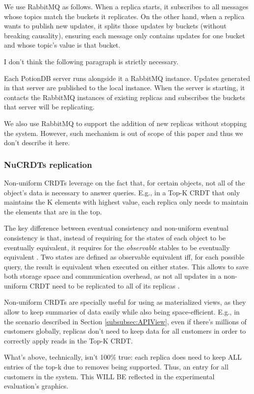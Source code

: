 \documentclass{vldb}
\newcommand{\grumbler}[2]{{\color{red}{\bf #1:} #2}}
\newcommand{\andre}[1]{\grumbler{andre}{#1}}
\begin{document}
We use RabbitMQ as follows.
When a replica starts, it subscribes to all messages whose topics match the buckets it replicates.
On the other hand, when a replica wants to publish new updates, it splits those updates by buckets (without breaking causality), ensuring each message only contains updates for one bucket and whose topic's value is that bucket.

\andre{I don't think the following paragraph is strictly necessary.}

Each PotionDB server runs alongside it a RabbitMQ instance.
Updates generated in that server are published to the local instance.
When the server is starting, it contacts the RabbitMQ instances of existing replicas and subscribes the buckets that server will be replicating.

We also use RabbitMQ to support the addition of new replicas without stopping the system.
However, such mechanism is out of scope of this paper and thus we don't describe it here.

\subsubsection{NuCRDTs replication}
\label{subsubsec:nureplication}

Non-uniform CRDTs \cite{???} leverage on the fact that, for certain objects, not all of the object's data is necessary to answer queries.
E.g., in a Top-K CRDT that only maintains the K elements with highest value, each replica only needs to maintain the elements that are in the top.

The key difference between eventual consistency and non-uniform eventual consistency is that, instead of requiring for the states of each object to be eventually equivalent, it requires for the \emph{observable} stables to be eventually equivalent \cite{???}.
Two states are defined as observable equivalent iff, for each possible query, the result is equivalent when executed on either states.
This allows to save both storage space and communication overhead, as not all updates in a non-uniform CRDT need to be replicated to all of its replicas \cite{???}.

Non-uniform CRDTs are specially useful for using as materialized views, as they allow to keep summaries of data easily while also being space-efficient.
E.g., in the scenario described in Section \ref{subsubsec:APIView}, even if there's millions of customers globally, replicas don't need to keep data for all customers in order to correctly apply reads in the Top-K CRDT.

\andre{What's above, technically, isn't 100\% true: each replica does need to keep ALL entries of the top-k due to removes being supported. Thus, an entry for all customers in the system. This WILL BE reflected in the experimental evaluation's graphics.}

\null\newpage\null

\null\newpage\null
\end{document}
